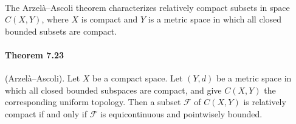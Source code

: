 \documentclass{article}
\numberwithin{equation}{section}
\theoremstyle{plain}
\theoremstyle{definition}
\begin{document}
\paragraph{} The Arzelà–Ascoli theorem characterizes relatively compact subsets in space $C(X,Y)$, where $X$ is compact and $Y$ is a metric space in which all closed bounded subsets are compact.

\paragraph{Theorem 7.23\label{thm:7.23}} (Arzelà–Ascoli). Let $X$ be a compact space. Let $(Y,d)$ be a metric space in which all closed bounded subspaces are compact, and give $C(X,Y)$ the corresponding uniform topology. Then a subset $\mathcal{F}$ of $C(X,Y)$ is relatively compact if and only if $\mathcal{F}$ is equicontinuous and pointwisely bounded.
\end{document}
